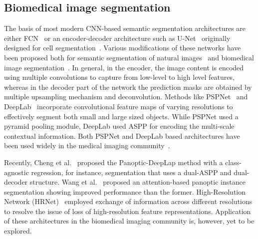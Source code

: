 \documentclass[journal]{IEEEtran}
\begin{document}
\subsection{Biomedical image segmentation}
The basis of most modern \ac{CNN}-based semantic segmentation architectures are either \ac{FCN}~\cite{long2015fully} or an encoder-decoder architecture such as U-Net~\cite{ronneberger2015u} originally designed for cell segmentation~\cite{ronneberger2015u}. Various modifications of these networks have been proposed both for semantic segmentation of natural images~\cite{zhong2020squeeze,zhao2017pyramid,wang2020deep} and biomedical image segmentation~\cite{fan2020pranet,zhou2018unet,zhou2019unet++,jha2019resunet++,jha2020doubleu,guo2020sa,ibtehaz2020multiresunet,oktay2018attention,wang2020boundary}. In general, in the encoder, the image content is encoded using multiple convolutions to capture from low-level to high level features, whereas in the decoder part of the network the prediction masks are obtained by multiple upsampling mechanism and deconvolution. Methods like PSPNet~\cite{zhao2017pyramid} and DeepLab~\cite{chen2017deeplab} incorporate convolutional feature maps of varying resolutions to effectively segment both small and large sized objects. While PSPNet used a pyramid pooling module, DeepLab used \ac{ASPP} for encoding the multi-scale contextual information. Both PSPNet and DeepLab based architectures have been used widely in the medical imaging community~\cite{hassan2020,sun2019colorectal,jha2019resunet++}.

Recently, Cheng et al.~\cite{Cheng:CVPR2020} proposed the Panoptic-DeepLap method with a class-agnostic regression, for instance, segmentation that uses a dual-ASPP and dual-decoder structure. Wang et al.~\cite{Huiyu:ECCV2020} proposed an attention-based panoptic instance segmentation showing improved performance than the former. High-Resolution Network (HRNet)~\cite{wang2020deep} employed exchange of information across different resolutions to resolve the issue of loss of high-resolution feature representations. Application of these architectures in the biomedical imaging community is, however, yet to be explored.
\end{document}
